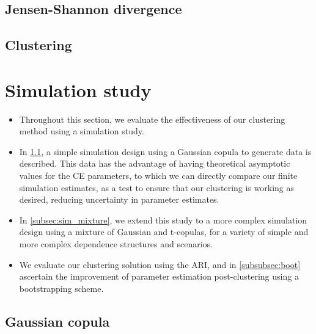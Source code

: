 \documentclass{article}
\numberwithin{equation}{section}
\begin{document}
\subsection{Jensen-Shannon divergence}
\subsection{Clustering}

\section{Simulation study}\label{sec:sim}

\begin{itemize}
  \item Throughout this section, we evaluate the effectiveness of our clustering method using a simulation study.
  \item In \ref{subsec:sim_gauss}, a simple simulation design using a Gaussian copula to generate data is described. 
  This data has the advantage of having theoretical asymptotic values for the CE parameters, to which we can directly compare our finite simulation estimates, as a test to ensure that our clustering is working as desired, reducing uncertainty in parameter estimates. 
  \item In \ref{subsec:sim_mixture}, we extend this study to a more complex simulation design using a mixture of Gaussian and t-copulas, for a variety of simple and more complex dependence structures and scenarios. 
  \item We evaluate our clustering solution using the ARI, and in \ref{subsubsec:boot} ascertain the improvement of parameter estimation post-clustering using a bootstrapping scheme. 
\end{itemize}

\subsection{Gaussian copula} \label{subsec:sim_gauss}
\end{document}
